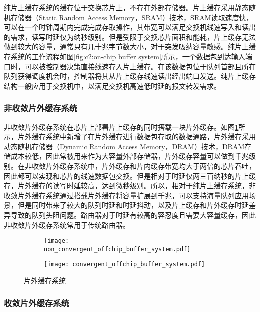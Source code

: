 纯片上缓存系统的缓存位于交换芯片上，不存在外部存储器。片上缓存采用静态随机存储器（Static Random Access Memory，SRAM）技术，SRAM读取速度快，可以在一个时钟周期内完成完成存取操作，其带宽可以满足交换机线速写入和读出的需求，读写时延仅为纳秒级别。但是受限于交换芯片面积和能耗，片上缓存无法做到较大的容量，通常只有几十兆字节数大小，对于突发吸纳容量敏感。纯片上缓存系统的工作流程如图\ref{fig:c2:on-chip buffer system}所示，一个数据包到达输入端口时，可以被控制器决策直接线速存入片上缓存。在该数据包位于队列首部且所在队列获得调度机会时，控制器将其从片上缓存线速读出经出端口发送。纯片上缓存结构一般应用于交换机中，以满足交换机高速低时延的报文转发需求。

\subsubsection{非收敛片外缓存系统}

非收敛片外缓存系统在芯片上部署片上缓存的同时搭载一块片外缓存。如图\ref{subfig:c2:non-convergent off-chip buffer system}所示，片外缓存系统中新增了在片外缓存进行数据包存取的数据通路，片外缓存采用动态随机存储器（Dynamic Random Access Memory，DRAM）技术，DRAM存储成本较低，因此常被用来作为大容量外部存储器，片外缓存容量可以做到千兆级别。在非收敛片外缓存系统中，片外缓存和片内缓存带宽均大于两倍的芯片吞吐，因此都可以实现和芯片的线速数据包交换。但是相对于时延仅两三百纳秒的片上缓存，片外缓存的读写时延较高，达到微秒级别。所以，相对于纯片上缓存系统，非收敛片外缓存系统通过搭载片外缓存将容量扩展到千兆，可以支持海量队列应用场景，但是同时带来了较大的队列时延和时延抖动，以及片上缓存和片外缓存时延差异导致的队列头阻问题。路由器对于时延有较高的容忍度且需要大容量缓存，因此非收敛片外缓存系统常用于传统路由器。

\begin{figure}[H]
  \begin{subfigure}[b]{0.49\linewidth}
      \centering
      \texttt{[image: non\_convergent\_offchip\_buffer\_system.pdf]}
      \label{subfig:c2:non-convergent off-chip buffer system}
  \end{subfigure}
  \begin{subfigure}[b]{0.49\linewidth}
      \centering
      \texttt{[image: convergent\_offchip\_buffer\_system.pdf]}
      \label{subfig:c2:convergent off-chip buffer system}
  \end{subfigure}
  \caption{片外缓存系统}
\end{figure}

\subsubsection{收敛片外缓存系统}

